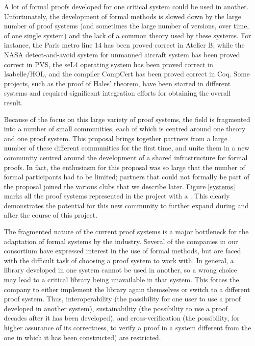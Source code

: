 
A lot of formal proofs developed for one critical system could be used
in another.  Unfortunately, the development of formal methods is
slowed down by the large number of proof systems (and sometimes the
large number of versions, over time, of one single system) and the
lack of a common theory used by these systems.  For instance, the
Paris metro line 14 has been proved correct in Atelier B, while the
NASA detect-and-avoid system for unmanned aircraft system has been
proved correct in PVS, the seL4 operating system has been proved
correct in Isabelle/HOL\cite{paulson700}, and the compiler CompCert
has been proved correct in Coq.  Some projects, such as the proof of
Hales' theorem, have been started in different systems and required
significant integration efforts for obtaining the overall result.

Because of the focus on this large variety of proof systems, the field
is fragmented into a number of small communities, each of which is
centred around one theory and one proof system. This proposal brings
together partners from a large number of these different communities
for the first time, and unite them in a new community
centred around the development of a shared infrastructure for formal
proofs.  In fact, the enthusiasm for this proposal was so large that the number
of formal participants had to be limited; partners that could not
formally be part of the proposal joined the various clubs that we
describe later.  Figure
\ref{systems} marks all the proof systems represented in the project
with a \s. This clearly demonstrates the potential for this new
community to further expand during and after the course of this project.

The fragmented nature of the current proof systems is a major
bottleneck for the adaptation of formal systems by the
industry. Several of the companies in our consortium have expressed
interest in the use of formal methods, but are faced with the
difficult task of choosing a proof system to work with. In general, a
library developed in one system cannot be used in another, so a wrong
choice may lead to a critical library being unavailable in that
system. This forces the company to either implement the library again
themselves or switch to a different proof system.  Thus,
interoperability (the possibility for one user to use a proof
developed in another system), sustainability (the possibility to use a
proof decades after it has been developed), and cross-verification
(the possibility, for higher assurance of its correctness, to verify a
proof in a system different from the one in which it has been constructed) are restricted.

